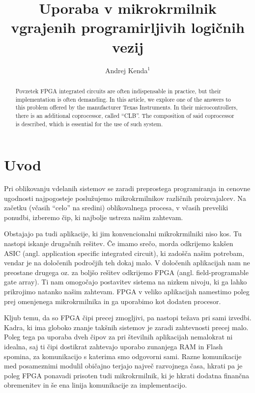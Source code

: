 \documentclass[a4paper]{article}
\begin{document}
\begin{sloppypar}
\title{Uporaba v mikrokrmilnik vgrajenih programirljivih logičnih vezij}

\author{Andrej Kenda$^{1}$}



\maketitle



\begin{abstract}{Povzetek}
FPGA integrated circuits are often indispensable in practice, but their implementation is often demanding. In this article, we explore one of the answers to this problem offered by the manufacturer Texas Instruments. In their microcontrollers, there is an additional coprocessor, called ``CLB''. The composition of said coprocessor is described, which is essential for the use of such system.
\end{abstract}




\section{Uvod}
Pri oblikovanju vdelanih sistemov se zaradi preprostega programiranja in
cenovne ugodnosti najpogosteje poslužujemo mikrokrmilnikov različnih
proizvajalcev. Na začetku (včasih ``celo'' na sredini) oblikovalnega procesa, v
včasih preveliki ponudbi, izberemo čip, ki najbolje ustreza našim zahtevam.

Obstajajo pa tudi aplikacije, ki jim konvencionalni mikrokrmilniki niso kos. Tu
nastopi iskanje drugačnih rešitev. Če imamo srečo, morda odkrijemo kakšen ASIC
(angl. application specific integrated circuit), ki zadošča našim potrebam,
vendar je na določenih področjih teh dokaj malo. V določenih aplikacijah nam ne
preostane drugega oz. za boljšo rešitev odkrijemo FPGA (angl. field-programable
gate array). Ti nam omogočajo postavitev sistema na nizkem nivoju, ki ga lahko
prikrojimo natanko našim zahtevam. FPGA v veliko aplikacijah namestimo poleg
prej omenjenega mikrokrmilnika in ga uporabimo kot dodaten procesor.

Kljub temu, da so FPGA čipi precej zmogljivi, pa nastopi težava pri sami
izvedbi. Kadra, ki ima globoko znanje takšnih sistemov je zaradi zahtevnosti
precej malo. Poleg tega pa uporaba dveh čipov za pri številnih aplikacijah
nemalokrat ni idealna, saj ti čipi dostikrat zahtevajo uporabo zunanjega RAM in
Flash spomina, za komunikacijo s katerima smo odgovorni sami. Razne
komunikacije med posameznimi modulil običajno terjajo največ razvojnega časa,
hkrati pa je poleg FPGA ponavadi prisoten tudi mikrokrmilnik, ki je hkrati
dodatna finančna obremenitev in še ena linija komunikacije za implementacijo.


\end{sloppypar}
\end{document}
